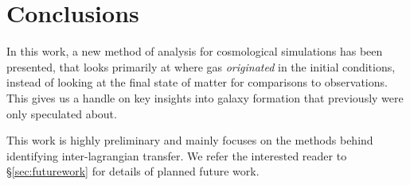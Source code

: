 \section{Conclusions}
\label{sec:conclusions}

In this work, a new method of analysis for cosmological simulations has been
presented, that looks primarily at where gas \emph{originated} in the initial
conditions, instead of looking at the final state of matter for comparisons
to observations. This gives us a handle on key insights into galaxy formation
that previously were only speculated about.

This work is highly preliminary and mainly focuses on the methods behind
identifying inter-lagrangian transfer. We refer the interested reader to
\S \ref{sec:futurework} for details of planned future work.

